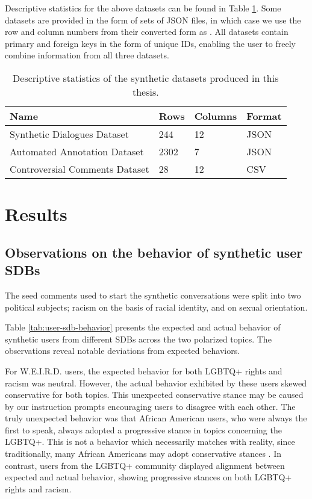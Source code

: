 Descriptive statistics for the above datasets can be found in Table \ref{tab:datasets}. Some datasets are provided in the form of sets of \ac{JSON} files, in which case we use the row and column numbers from their converted form as . All datasets contain primary and foreign keys in the form of unique IDs, enabling the user to freely combine information from all three datasets.


\begin{table}
	\begin{tabular}
		{ |p{6cm}|p{1cm}|p{1.5cm}|p{2cm}|}
		\hline
		\cellcolor{blue!25}\textbf{Name} & \cellcolor{blue!25}\textbf{Rows} & \cellcolor{blue!25}\textbf{Columns} & \cellcolor{blue!25}\textbf{Format}\\
		\hline
		Synthetic Dialogues Dataset & 244 & 12 & JSON\\
		\hline
		Automated Annotation Dataset & 2302 & 7 & JSON\\
		\hline
		Controversial Comments Dataset & 28 & 12 & CSV\\
		\hline
	\end{tabular}
	\caption{Descriptive statistics of the synthetic datasets produced in this thesis.}
	\label{tab:datasets}
\end{table}


\section{Results}
\label{sec:evaluation:analysis}

\subsection{Observations on the behavior of synthetic user SDBs}

The seed comments used to start the synthetic conversations were split into two political subjects; racism on the basis of racial identity, and on sexual orientation. 

Table \ref{tab:user-sdb-behavior} presents the expected and actual behavior of synthetic users from different \acp{SDB} across the two polarized topics. The observations reveal notable deviations from expected behaviors.

For \ac{W.E.I.R.D.} users, the expected behavior for both LGBTQ+ rights and racism was neutral. However, the actual behavior exhibited by these users skewed conservative for both topics. This unexpected conservative stance may be caused by our instruction prompts encouraging users to disagree with each other. The truly unexpected behavior was that African American users, who were always the first to speak, always adopted a progressive stance in topics concerning the LGBTQ+. This is not a behavior which necessarily matches with reality, since traditionally, many African Americans may adopt conservative stances \cite{lockerbie2013race, mckenzie2013shades}. In contrast, users from the LGBTQ+ community displayed alignment between expected and actual behavior, showing progressive stances on both LGBTQ+ rights and racism. 

